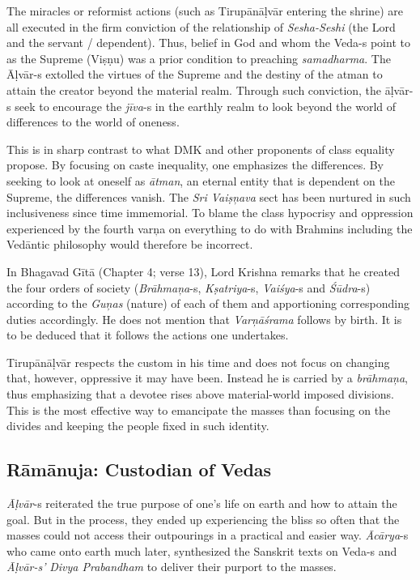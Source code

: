 The miracles or reformist actions (such as Tirupānāḷvār entering the shrine) are all executed in the firm conviction of the relationship of \textit{Sesha-Seshi} (the Lord and the servant / dependent). Thus, belief in God and whom the Veda-s point to as the Supreme (Viṣṇu) was a prior condition to preaching \textit{samadharma}. The Āḷvār-s extolled the virtues of the Supreme and the destiny of the atman to attain the creator beyond the material realm. Through such conviction, the āḷvār-s seek to encourage the \textit{jīva}-s in the earthly realm to look beyond the world of differences to the world of oneness.

This is in sharp contrast to what DMK and other proponents of class equality propose. By focusing on caste inequality, one emphasizes the differences. By seeking to look at oneself as \textit{ātman}, an eternal entity that is dependent on the Supreme, the differences vanish. The \textit{Sri Vaiṣņava} sect has been nurtured in such inclusiveness since time immemorial. To blame the class hypocrisy and oppression experienced by the fourth varņa on everything to do with Brahmins including the Vedāntic philosophy would therefore be incorrect.

In Bhagavad Gītā (Chapter 4; verse 13), Lord Krishna remarks that he created the four orders of society (\textit{Brāhmaņa}-s, \textit{Kṣatriya}-s, \textit{Vaiśya}-s and \textit{Śūdra}-s) according to the \textit{Guņas} (nature) of each of them and apportioning corresponding duties accordingly. He does not mention that \textit{Varņāśrama} follows by birth. It is to be deduced that it follows the actions one undertakes.

Tirupānāḷvār respects the custom in his time and does not focus on changing that, however, oppressive it may have been. Instead he is carried by a \textit{brāhmaņa}, thus emphasizing that a devotee rises above material-world imposed divisions. This is the most effective way to emancipate the masses than focusing on the divides and keeping the people fixed in such identity.


\subsection*{Rāmānuja: Custodian of Vedas}

\textit{Āḷvār}-s reiterated the true purpose of one’s life on earth and how to attain the goal. But in the process, they ended up experiencing the bliss so often that the masses could not access their outpourings in a practical and easier way. \textit{Ācārya}-s who came onto earth much later, synthesized the Sanskrit texts on Veda-s and \textit{Āḷvār-s’ }\textit{Divya Prabandham} to deliver their purport to the masses.

